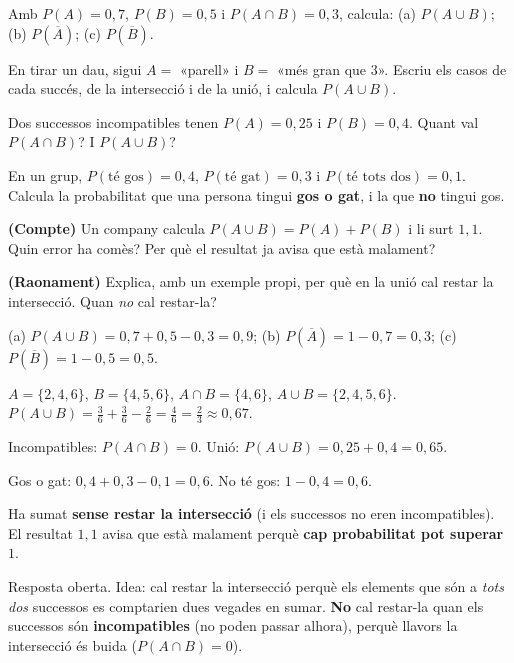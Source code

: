 \begin{exercicis}
\begin{exlist}
  \item Amb $P(A)=0,7$, $P(B)=0,5$ i $P(A\cap B)=0,3$, calcula: (a) $P(A\cup B)$;
        (b) $P(\overline{A})$; (c) $P(\overline{B})$.
  \item En tirar un dau, sigui $A=$ «parell» i $B=$ «més gran que $3$». Escriu els casos
        de cada succés, de la intersecció i de la unió, i calcula $P(A\cup B)$.
  \item Dos successos incompatibles tenen $P(A)=0,25$ i $P(B)=0,4$. Quant val
        $P(A\cap B)$? I $P(A\cup B)$?
  \item En un grup, $P(\text{té gos})=0,4$, $P(\text{té gat})=0,3$ i
        $P(\text{té tots dos})=0,1$. Calcula la probabilitat que una persona tingui
        \textbf{gos o gat}, i la que \textbf{no} tingui gos.
  \item \textbf{(Compte)} Un company calcula $P(A\cup B)=P(A)+P(B)$ i li surt $1,1$.
        Quin error ha comès? Per què el resultat ja avisa que està malament?
  \item \textbf{(Raonament)} Explica, amb un exemple propi, per què en la unió cal restar
        la intersecció. Quan \emph{no} cal restar-la?
\end{exlist}
\end{exercicis}

\begin{solucions}
\begin{sollist}
  \item (a) $P(A\cup B)=0,7+0,5-0,3=0,9$; (b) $P(\overline{A})=1-0,7=0,3$; (c)
        $P(\overline{B})=1-0,5=0,5$.
  \item $A=\{2,4,6\}$, $B=\{4,5,6\}$, $A\cap B=\{4,6\}$, $A\cup B=\{2,4,5,6\}$.
        $P(A\cup B)=\frac{3}{6}+\frac{3}{6}-\frac{2}{6}=\frac{4}{6}=\frac{2}{3}\approx 0,67$.
  \item Incompatibles: $P(A\cap B)=0$. Unió: $P(A\cup B)=0,25+0,4=0,65$.
  \item Gos o gat: $0,4+0,3-0,1=0,6$. No té gos: $1-0,4=0,6$.
  \item Ha sumat \textbf{sense restar la intersecció} (i els successos no eren
        incompatibles). El resultat $1,1$ avisa que està malament perquè \textbf{cap
        probabilitat pot superar $1$}.
  \item Resposta oberta. Idea: cal restar la intersecció perquè els elements que són a
        \emph{tots dos} successos es comptarien dues vegades en sumar. \textbf{No} cal
        restar-la quan els successos són \textbf{incompatibles} (no poden passar alhora),
        perquè llavors la intersecció és buida ($P(A\cap B)=0$).
\end{sollist}
\end{solucions}

